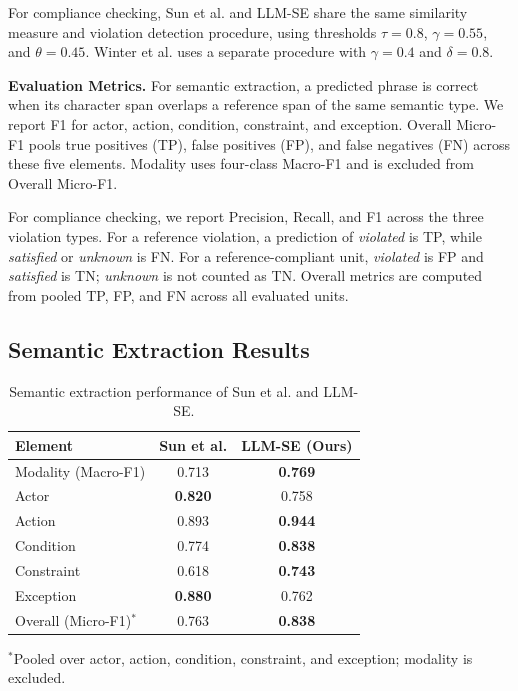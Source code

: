 \documentclass[conference]{IEEEtran}
\begin{document}
For compliance checking, Sun et al. and LLM-SE share the same similarity measure and violation detection procedure, using thresholds $\tau=0.8$, $\gamma=0.55$, and $\theta=0.45$. Winter et al. uses a separate procedure with $\gamma=0.4$ and $\delta=0.8$.

\textbf{Evaluation Metrics.}
For semantic extraction, a predicted phrase is correct when its character span overlaps a reference span of the same semantic type. We report F1 for actor, action, condition, constraint, and exception. Overall Micro-F1 pools true positives (TP), false positives (FP), and false negatives (FN) across these five elements. Modality uses four-class Macro-F1 and is excluded from Overall Micro-F1.

For compliance checking, we report Precision, Recall, and F1 across the three violation types. For a reference violation, a prediction of \emph{violated} is TP, while \emph{satisfied} or \emph{unknown} is FN. For a reference-compliant unit, \emph{violated} is FP and \emph{satisfied} is TN; \emph{unknown} is not counted as TN. Overall metrics are computed from pooled TP, FP, and FN across all evaluated units.

\subsection{Semantic Extraction Results}
\label{sec:4.2}

\begin{table}[t]
\centering
\caption{Semantic extraction performance of Sun et al. and LLM-SE.}
\label{tab:semantic_results}
\begin{tabular}{lcc}
\toprule
\textbf{Element} & \textbf{Sun et al.} & \textbf{LLM-SE (Ours)} \\
\midrule
Modality (Macro-F1) & 0.713 & \textbf{0.769} \\
Actor                & \textbf{0.820} & 0.758 \\
Action               & 0.893 & \textbf{0.944} \\
Condition            & 0.774 & \textbf{0.838} \\
Constraint           & 0.618 & \textbf{0.743} \\
Exception            & \textbf{0.880} & 0.762 \\
\midrule
Overall (Micro-F1)$^{*}$ & 0.763 & \textbf{0.838} \\
\bottomrule
\end{tabular}

\vspace{1mm}
\footnotesize{$^{*}$Pooled over actor, action, condition, constraint, and exception; modality is excluded.}
\end{table}
\end{document}
